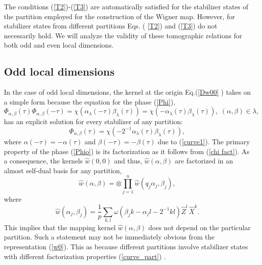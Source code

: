 \documentclass{article}
\begin{document}
The conditions (\ref{T2})-(\ref{T3}) are automatically satisfied for the
stabilizer states of the partition employed for the construction of the
Wigner map. However, for stabilizer states from different partitions Eqs. (%
\ref{T2}) and (\ref{T3}) do not necessarily hold. We will analyze the
validity of these tomographic relations for both odd and even local
dimensions.

\subsection{Odd local dimensions}

In the case of odd local dimensions, the kernel at the origin Eq.(\ref{Dw00}%
) takes on a simple form because the equation for the phase (\ref{Phi}), 
\begin{equation*}
\Phi _{\alpha ,\beta }\left( \tau \right) \Phi _{\alpha ,\beta }\left( -\tau
\right) =\chi \left( \alpha _{\lambda }(-\tau )\beta _{\lambda }(\tau
)\right) =\chi \left( -\alpha _{\lambda }(\tau )\beta _{\lambda }(\tau
)\right) ,\;(\alpha ,\beta )\in \lambda ,
\end{equation*}%
has an explicit solution for every stabilizer of any partition:%
\begin{equation}
\Phi _{\alpha ,\beta }\left( \tau \right) =\chi \left( -2^{-1}\alpha
_{\lambda }(\tau )\beta _{\lambda }(\tau )\right) ,  \label{Phio}
\end{equation}%
where $\alpha (-\tau )=-\alpha (\tau )$ and $\beta (-\tau )=-\beta (\tau )$
due to (\ref{curve1}). The primary property of the phase (\ref{Phio}) is its
factorization as it follows from (\ref{chi fact}). As a consequence, the
kernels $\hat{w}\left( 0,0\right) $ and thus, $\hat{w}\left( \alpha ,\beta
\right) $ are factorized in an almost self-dual basis for any partition,%
\begin{equation*}
\hat{w}\left( \alpha ,\beta \right) =\otimes \prod\limits_{j=1}^{n}\hat{w}%
\left( q_{j}\alpha _{j},\beta _{j}\right) ,
\end{equation*}%
where%
\begin{equation*}
\hat{w}(\alpha _{j},\beta _{j})=\frac{1}{p}\sum_{k,l}\omega (\beta
_{j}k-\alpha _{j}l-2^{-1}kl)\hat{Z}^{l}\,\hat{X}^{k}.
\end{equation*}%
This implies that the mapping kernel $\hat{w}\left( \alpha ,\beta \right) $
does not depend on the particular partition. Such a statement may not be
immediately obvious from the representation (\ref{w0}). This as because
different partitions involve stabilizer states with different factorization
properties (\ref{curve_part}) \cite{Bjork2007}.
\end{document}
